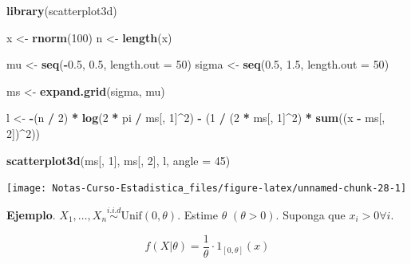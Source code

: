 \documentclass[
  12pt,
]{book}
\newenvironment{Shaded}{\begin{snugshade}}{\end{snugshade}}
\newcommand{\DataTypeTok}[1]{\textcolor[rgb]{0.13,0.29,0.53}{#1}}
\newcommand{\DecValTok}[1]{\textcolor[rgb]{0.00,0.00,0.81}{#1}}
\newcommand{\FloatTok}[1]{\textcolor[rgb]{0.00,0.00,0.81}{#1}}
\newcommand{\KeywordTok}[1]{\textcolor[rgb]{0.13,0.29,0.53}{\textbf{#1}}}
\newcommand{\NormalTok}[1]{#1}
\newcommand{\OperatorTok}[1]{\textcolor[rgb]{0.81,0.36,0.00}{\textbf{#1}}}
\newcommand{\StringTok}[1]{\textcolor[rgb]{0.31,0.60,0.02}{#1}}
\begin{document}
\begin{Shaded}
\begin{Highlighting}[]
\KeywordTok{library}\NormalTok{(scatterplot3d)}

\NormalTok{x \textless{}{-}}\StringTok{ }\KeywordTok{rnorm}\NormalTok{(}\DecValTok{100}\NormalTok{)}
\NormalTok{n \textless{}{-}}\StringTok{ }\KeywordTok{length}\NormalTok{(x)}

\NormalTok{mu \textless{}{-}}\StringTok{ }\KeywordTok{seq}\NormalTok{(}\OperatorTok{{-}}\FloatTok{0.5}\NormalTok{, }\FloatTok{0.5}\NormalTok{, }\DataTypeTok{length.out =} \DecValTok{50}\NormalTok{)}
\NormalTok{sigma \textless{}{-}}\StringTok{ }\KeywordTok{seq}\NormalTok{(}\FloatTok{0.5}\NormalTok{, }\FloatTok{1.5}\NormalTok{, }\DataTypeTok{length.out =} \DecValTok{50}\NormalTok{)}

\NormalTok{ms \textless{}{-}}\StringTok{ }\KeywordTok{expand.grid}\NormalTok{(sigma, mu)}

\NormalTok{l \textless{}{-}}\StringTok{ }\OperatorTok{{-}}\NormalTok{(n }\OperatorTok{/}\StringTok{ }\DecValTok{2}\NormalTok{) }\OperatorTok{*}\StringTok{ }\KeywordTok{log}\NormalTok{(}\DecValTok{2} \OperatorTok{*}\StringTok{ }\NormalTok{pi }\OperatorTok{/}\StringTok{ }\NormalTok{ms[, }\DecValTok{1}\NormalTok{]}\OperatorTok{\^{}}\DecValTok{2}\NormalTok{) }\OperatorTok{{-}}\StringTok{ }\NormalTok{(}\DecValTok{1} \OperatorTok{/}\StringTok{ }\NormalTok{(}\DecValTok{2} \OperatorTok{*}\StringTok{ }\NormalTok{ms[, }\DecValTok{1}\NormalTok{]}\OperatorTok{\^{}}\DecValTok{2}\NormalTok{) }\OperatorTok{*}\StringTok{ }\KeywordTok{sum}\NormalTok{((x }\OperatorTok{{-}}\StringTok{ }\NormalTok{ms[, }\DecValTok{2}\NormalTok{])}\OperatorTok{\^{}}\DecValTok{2}\NormalTok{))}

\KeywordTok{scatterplot3d}\NormalTok{(ms[, }\DecValTok{1}\NormalTok{], ms[, }\DecValTok{2}\NormalTok{], l, }\DataTypeTok{angle =} \DecValTok{45}\NormalTok{)}
\end{Highlighting}
\end{Shaded}

\begin{center}\texttt{[image: Notas-Curso-Estadistica\_files/figure-latex/unnamed-chunk-28-1]} \end{center}

\textbf{Ejemplo}. \(X_1,\dots, X_n \stackrel{i.i.d}{\sim} \text{Unif}(0, \theta)\). Estime \(\theta\) \((\theta > 0)\). Suponga que \(x_i>0 \forall i\).

\[f(X|\theta) = \dfrac 1\theta \cdot 1_{[0,\theta]}(x)\]
\end{document}
